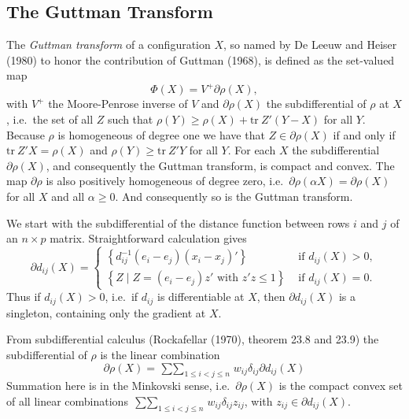 \documentclass[
  12pt,
]{article}
\begin{document}
\subsection{The Guttman Transform}\label{the-guttman-transform}

The \emph{Guttman transform} of a configuration \(X\), so named by De Leeuw and Heiser (1980) to honor the contribution of Guttman (1968), is defined as the set-valued map
\begin{equation}
\Phi(X)=V^+\partial\rho(X),
\label{eq:phidef}
\end{equation}
with \(V^+\) the Moore-Penrose inverse of \(V\) and \(\partial\rho(X)\) the
subdifferential of \(\rho\) at \(X\), i.e.~the set of all \(Z\) such that
\(\rho(Y)\geq\rho(X)+\text{tr}\ Z'(Y-X)\)
for all \(Y\). Because \(\rho\) is homogeneous of degree one we have that \(Z\in\partial\rho(X)\)
if and only if \(\text{tr}\ Z'X=\rho(X)\) and
\(\rho(Y)\geq\text{tr}\ Z'Y\) for all \(Y\). For each \(X\)
the subdifferential \(\partial\rho(X)\), and consequently the Guttman transform, is compact and convex. The map \(\partial\rho\)
is also positively homogeneous of degree zero, i.e.~\(\partial\rho(\alpha X)=\partial\rho(X)\) for all \(X\) and all \(\alpha\geq 0\). And consequently so is the
Guttman transform.

We start with the subdifferential of the distance function between
rows \(i\) and \(j\) of an \(n\times p\) matrix. Straightforward calculation
gives
\begin{equation}
\partial d_{ij}(X)=\begin{cases}
\left\{d_{ij}^{-1}(e_i-e_j)(x_i-x_j)'\right\}&\text{ if }d_{ij}(X)>0,\\
\left\{Z\mid Z=(e_i-e_j)z'\text{ with }z'z\leq1\right\}&\text{ if }d_{ij}(X)=0.
\end{cases}
\label{eq:dsubsef}
\end{equation}
Thus if \(d_{ij}(X)>0\), i.e.~if \(d_{ij}\) is differentiable at \(X\),
then \(\partial d_{ij}(X)\) is a singleton, containing only the gradient
at \(X\).

From subdifferential calculus (Rockafellar (1970), theorem 23.8 and 23.9) the subdifferential of \(\rho\) is the linear combination
\begin{equation}
\partial\rho(X)=\mathop{\sum\sum}_{1\leq i<j\leq n}w_{ij}\delta_{ij}\partial d_{ij}(X)
\label{eq:subdif}
\end{equation}
Summation here is in the Minkovski sense, i.e.~\(\partial\rho(X)\) is the compact convex set of all linear combinations \(\mathop{\sum\sum}_{1\leq i<j\leq n}w_{ij}\delta_{ij}z_{ij}\),
with \(z_{ij}\in\partial d_{ij}(X)\).
\end{document}
